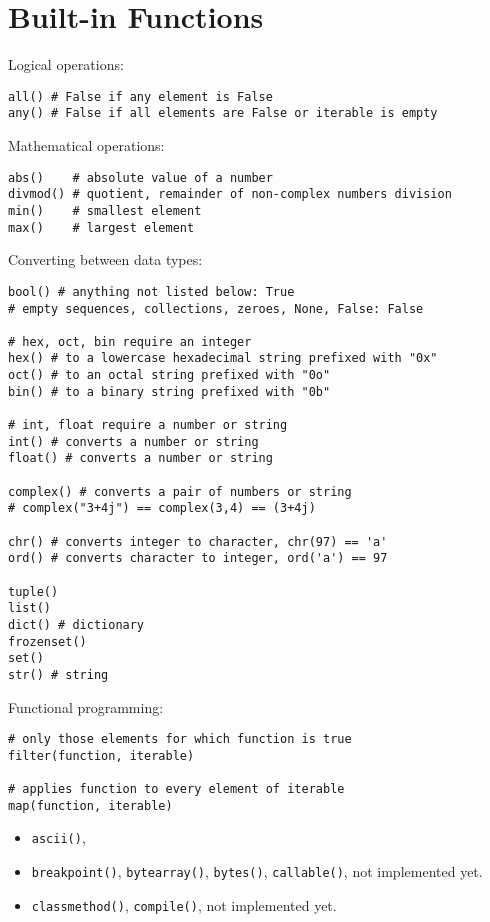 \section{Built-in Functions}
Logical operations:
\begin{verbatim}
all() # False if any element is False
any() # False if all elements are False or iterable is empty
\end{verbatim}

Mathematical operations:
\begin{verbatim}
abs()    # absolute value of a number
divmod() # quotient, remainder of non-complex numbers division
min()    # smallest element
max()    # largest element
\end{verbatim}

Converting between data types:
\begin{verbatim}
bool() # anything not listed below: True
# empty sequences, collections, zeroes, None, False: False

# hex, oct, bin require an integer
hex() # to a lowercase hexadecimal string prefixed with "0x"
oct() # to an octal string prefixed with "0o"
bin() # to a binary string prefixed with "0b"
       
# int, float require a number or string
int() # converts a number or string
float() # converts a number or string

complex() # converts a pair of numbers or string
# complex("3+4j") == complex(3,4) == (3+4j)

chr() # converts integer to character, chr(97) == 'a'
ord() # converts character to integer, ord('a') == 97

tuple()
list()
dict() # dictionary
frozenset()
set()
str() # string
\end{verbatim}

Functional programming:
\begin{verbatim}
# only those elements for which function is true
filter(function, iterable)

# applies function to every element of iterable
map(function, iterable)
\end{verbatim}

\begin{itemize}

\item
\texttt{ascii()},

\item
\texttt{breakpoint()},
\texttt{bytearray()},
\texttt{bytes()},
\texttt{callable()},
\dotfill not implemented yet.



\item
\texttt{classmethod()},
\texttt{compile()},
\dotfill not implemented yet.
\end{itemize}



